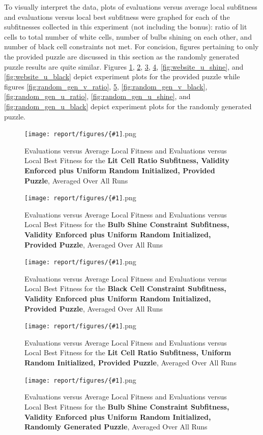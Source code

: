 \documentclass[11pt]{article}
\newcommand{\fitnessplotcaption}[1]{\caption{Evaluations versus Average Local Fitness and Evaluations versus 
    Local Best Fitness for the \textbf{{#1}}, Averaged Over All Runs}}
\newcommand{\addgraphic}[1]{\centerline{\texttt{[image: report/figures/\{\#1]}.png}}}
\begin{document}
To visually interpret the data, plots of evaluations versus average local subfitness and evaluations 
versus local best subfitness were graphed for each of the subfitnesses collected in this experiment (not
including the bonus):
ratio of lit cells to total number of white cells, number of bulbs shining on each other, and 
number of black cell constraints not met. For concision, figures pertaining to only the provided puzzle
are discussed in this section as the randomly generated puzzle results are quite similar. Figures 
\ref{fig:website_v_ratio}, \ref{fig:website_v_shine}, \ref{fig:website_v_black}, 
\ref{fig:website_u_ratio}, \ref{fig:website_u_shine}, and \ref{fig:website_u_black} depict experiment 
plots for the provided puzzle while figures
\ref{fig:random_gen_v_ratio}, \ref{fig:random_gen_v_shine}, \ref{fig:random_gen_v_black},
\ref{fig:random_gen_u_ratio}, \ref{fig:random_gen_u_shine}, and \ref{fig:random_gen_u_black} depict 
experiment plots for the randomly generated puzzle. 

\begin{figure}[H]
    \addgraphic{website_puzzle_lit_cell_ratio__graph}
    \fitnessplotcaption{Lit Cell Ratio Subfitness, Validity Enforced plus Uniform Random Initialized, Provided Puzzle}
    \label{fig:website_v_ratio}
\end{figure}

\begin{figure}[H]
    \addgraphic{website_puzzle_bulb_shine_constr__graph}
    \fitnessplotcaption{Bulb Shine Constraint Subfitness, Validity Enforced plus Uniform Random Initialized, Provided Puzzle}
    \label{fig:website_v_shine}
\end{figure}

\begin{figure}[H]
    \addgraphic{website_puzzle_black_cell_constr__graph}
    \fitnessplotcaption{Black Cell Constraint Subfitness, Validity Enforced plus Uniform Random Initialized, Provided Puzzle}
    \label{fig:website_v_black}
\end{figure}

\begin{figure}[H]
    \addgraphic{website_puzzle_uniform_random_init_lit_cell_ratio__graph}
    \fitnessplotcaption{Lit Cell Ratio Subfitness, Uniform Random Initialized, Provided Puzzle}
    \label{fig:website_u_ratio}
\end{figure}

\begin{figure}[H]
    \addgraphic{random_gen_bulb_shine_constr__graph}
    \fitnessplotcaption{Bulb Shine Constraint Subfitness, Validity Enforced plus Uniform Random Initialized, Randomly Generated Puzzle}
    \label{fig:random_gen_v_shine}
\end{figure}
\end{document}
